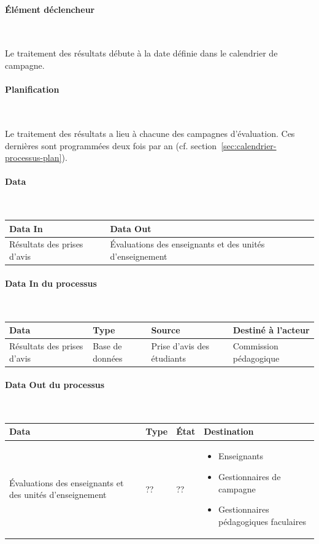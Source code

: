 \documentclass[a4paper,11pt]{report}
\begin{document}
\paragraph{Élément déclencheur}~\newline{}

Le traitement des résultats débute à la date définie dans le calendrier de campagne.

\paragraph{Planification}~\newline{}

Le traitement des résultats a lieu à chacune des campagnes d'évaluation.
Ces dernières sont programmées deux fois par an (cf. section~\ref{sec:calendrier-processus-plan}).

\paragraph{Data}~\newline{}

\begin{tabularx}{\linewidth}{|X|X|} \hline
Data In & Data Out \\ \hline
Résultats des prises d'avis & Évaluations des enseignants et des unités d'enseignement\\ \hline
\end{tabularx}

\paragraph{Data In du processus}~\newline{}

\begin{tabularx}{\linewidth}{|X|X|X|X|} \hline
Data & Type & Source & Destiné à l'acteur \\ \hline
Résultats des prises d'avis & Base de données & Prise d'avis des étudiants & Commission pédagogique \\ \hline
\end{tabularx}

\paragraph{Data Out du processus}~\newline{}

\begin{tabularx}{\linewidth}{|X|X|X|X|} \hline
Data & Type & État & Destination \\ \hline
Évaluations des enseignants et des unités d'enseignement & ?? & ?? & 
\begin{itemize}
	\item Enseignants
	\item Gestionnaires de campagne
	\item Gestionnaires pédagogiques faculaires
\end{itemize}
\\ \hline
\end{tabularx}
\end{document}
